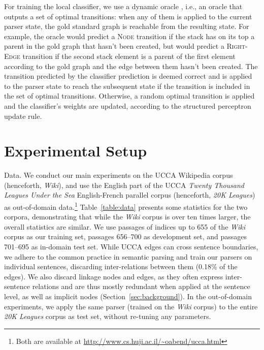 \documentclass[11pt]{article}
\makeatletter
\newcommand{\secref}[1]{Section~\ref{#1}}
\newcommand{\tabref}[1]{Table~\ref{#1}}
\renewcommand{\paragraph}{
  \@startsection{paragraph}{4}
  {\z@}{.5ex \@plus .5ex \@minus .2ex}{-1em}
  {\normalfont\normalsize\bfseries}
}
\makeatother
\begin{document}
For training the local classifier, we use a dynamic oracle \cite{goldberg2012dynamic},
i.e., an oracle that outputs a set of optimal transitions: when any of them
is applied to the current parser state, the gold
standard graph is reachable from the resulting state.
For example, the oracle would predict a \textsc{Node} transition if the stack 
has on its top a parent in the gold graph that hasn't been created,
but would predict a \textsc{Right-Edge} transition if the second stack
element is a parent of the
first element according to the gold graph and the edge between them hasn't been created.
The transition predicted by the classifier prediction is deemed correct
and is applied to the parser state to reach the subsequent state
if the transition is included in the set of optimal transitions.
Otherwise, a random optimal transition is applied
and the classifier's weights are updated, according to the structured perceptron
update rule.




\section{Experimental Setup}\label{sec:exp_setup}

\paragraph{Data.}\label{sec:data}
We conduct our main experiments on the UCCA Wikipedia corpus (henceforth, \textit{Wiki}),
and use the English part of the UCCA \textit{Twenty Thousand Leagues Under the Sea} English-French parallel corpus (henceforth, \textit{20K Leagues}) as
out-of-domain data.\footnote{Both are available at \url{http://www.cs.huji.ac.il/~oabend/ucca.html}}
\tabref{table:data} presents some statistics for the two corpora, demonstrating that while
the \textit{Wiki} corpus is over ten times larger, the overall statistics are
similar.
We use passages of indices up to 655
of the \textit{Wiki} corpus as our training set, passages 656--700 as development set,
and passages 701--695 as in-domain test set.
While UCCA edges can cross sentence boundaries, we adhere to the common
practice in semantic parsing and train our parsers on individual sentences,
discarding inter-relations between them (0.18\% of the edges).
We also discard linkage nodes and edges, as they often express inter-sentence
relations and are thus mostly redundant when applied at the sentence level,
as well as implicit nodes (\secref{sec:background}).
In the out-of-domain experiments, we apply the same parser
(trained on the \textit{Wiki} corpus) to the entire \textit{20K Leagues}
corpus as test set, without re-tuning any parameters.
\end{document}
